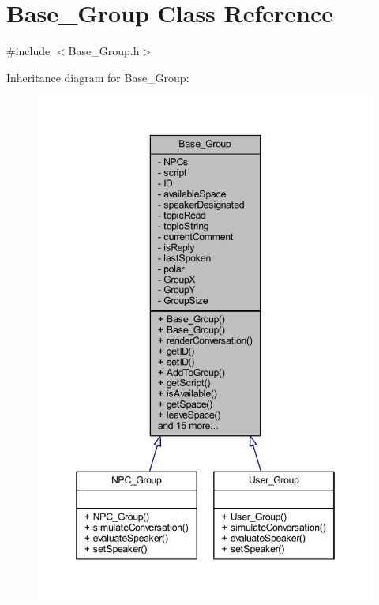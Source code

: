 \hypertarget{class_base___group}{}\section{Base\+\_\+\+Group Class Reference}
\label{class_base___group}


{\ttfamily \#include $<$Base\+\_\+\+Group.\+h$>$}



Inheritance diagram for Base\+\_\+\+Group\+:\nopagebreak
\begin{figure}[H]
\begin{center}
\leavevmode
\includegraphics[width=346pt]{class_base___group__inherit__graph}
\end{center}
\end{figure}


